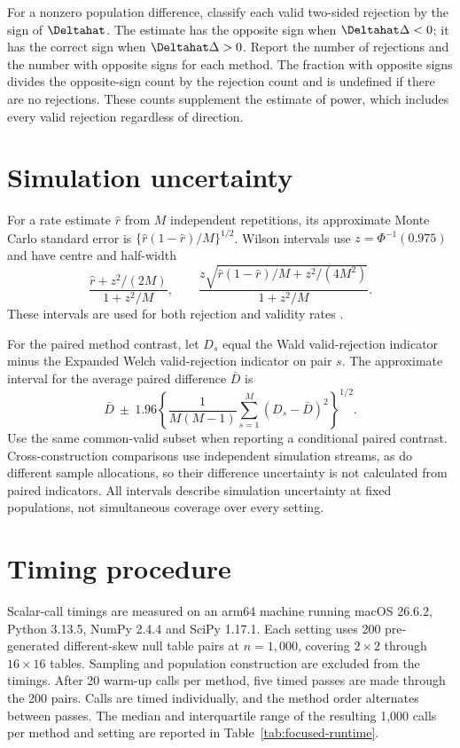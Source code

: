 \medskip
{}

For a nonzero population difference, classify each valid two-sided rejection
by the sign of \(\Deltahat\). The estimate has the opposite sign when
\(\Deltahat\Delta<0\); it has the correct sign when
\(\Deltahat\Delta>0\). Report the number of rejections and the
number with opposite signs for each method. The fraction with opposite
signs divides the opposite-sign count by the rejection count and is undefined
if there are no rejections. These counts supplement the estimate of power,
which includes every valid rejection regardless of direction.

\section{Simulation uncertainty}
\label{sec:simulation-uncertainty}

For a rate estimate \(\widehat r\) from \(M\) independent repetitions,
its approximate Monte Carlo standard error is
\(\{\widehat r(1-\widehat r)/M\}^{1/2}\).
Wilson intervals use \(z=\Phi^{-1}(0.975)\) and have centre and
half-width
\begin{equation}
 \frac{\widehat r+z^2/(2M)}{1+z^2/M},
 \qquad
 \frac{z\sqrt{\widehat r(1-\widehat r)/M+z^2/(4M^2)}}{1+z^2/M}.
\end{equation}
These intervals are used for both rejection and validity rates
\citep{wilson1927}.

For the paired method contrast, let \(D_s\) equal the Wald
valid-rejection indicator minus the Expanded Welch valid-rejection
indicator on pair \(s\). The approximate interval for the average paired difference
\(\bar D\) is
\begin{equation}
 \bar D\ \pm\ 1.96
 \left\{\frac{1}{M(M-1)}\sum_{s=1}^M(D_s-\bar D)^2\right\}^{1/2}.
\end{equation}
Use the same common-valid subset when reporting a conditional paired
contrast. Cross-construction comparisons use independent simulation
streams, as do different sample allocations, so their difference uncertainty is not calculated from paired
indicators. All intervals describe simulation uncertainty at fixed
populations, not simultaneous coverage over every setting.

\section{Timing procedure}
\label{sec:timing-procedure}

Scalar-call timings are measured on an arm64 machine running macOS
26.6.2, Python 3.13.5, NumPy 2.4.4 and SciPy 1.17.1. Each setting
uses 200 pre-generated different-skew null table pairs at
\(n=1{,}000\), covering \(2\times2\) through \(16\times16\) tables.
Sampling and population construction are excluded from the timings.
After 20 warm-up calls per method, five timed passes are made through
the 200 pairs. Calls are timed individually, and the method order
alternates between passes. The median and interquartile range of the
resulting 1,000 calls per method and setting are reported in
Table~\ref{tab:focused-runtime}.
